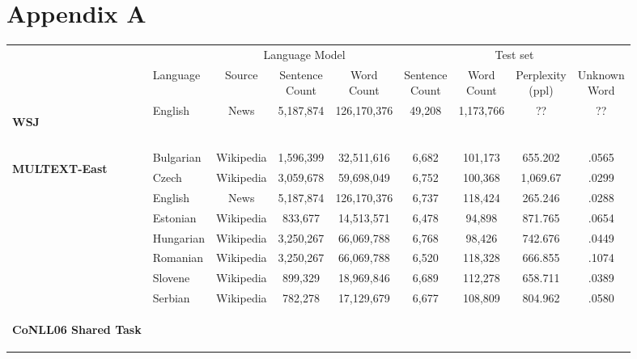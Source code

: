 \appendix
\section{Appendix A}
\label{app:lm}

\begin{table}[h]
  \begin{tabular}{l|l|c|c|c|c|c|c|c|}
    \cline{2-9}
    & & \multicolumn{3}{c|}{Language Model} & \multicolumn{4}{c|}{Test set}\\    \cline{2-9}
    & Language & Source & \specialcell{Sentence\\Count} & \specialcell{Word\\Count} & \specialcell{Sentence\\Count} & \specialcell{Word\\Count} & \specialcell{Perplexity\\(ppl)} & \specialcell{Unknown\\Word} \\ \cline{1-9}
    \multirow{1}{*}{\begin{sideways}\textbf{WSJ}\end{sideways}} 
    &English & News & 5,187,874 & 126,170,376 & 49,208 & 1,173,766 & ?? & ??\\
    & & & & && & &\\\hline
    \multirow{8}{*}{\begin{sideways}\textbf{MULTEXT-East}\end{sideways}}
    &Bulgarian& Wikipedia &1,596,399 & 32,511,616  & 6,682 & 101,173 & 655.202 & .0565\\
    &Czech & Wikipedia &3,059,678 & 59,698,049 & 6,752 & 100,368 & 1,069.67 & .0299\\
    &English & News & 5,187,874 & 126,170,376 & 6,737 & 118,424 & 265.246 & .0288\\
    &Estonian & Wikipedia &833,677 & 14,513,571 & 6,478 & 94,898 & 871.765 & .0654\\
    &Hungarian & Wikipedia &3,250,267& 66,069,788 & 6,768 & 98,426 & 742.676 & .0449\\
    &Romanian & Wikipedia &3,250,267&66,069,788  & 6,520 & 118,328 & 666.855 & .1074\\
    &Slovene & Wikipedia & 899,329&18,969,846 & 6,689 & 112,278 & 658.711 & .0389\\
    &Serbian & Wikipedia & 782,278 & 17,129,679 & 6,677 & 108,809 & 804.962 & .0580\\
    \hline %
    \multirow{10}{*}{\begin{sideways}\textbf{CoNLL06 Shared Task}\end{sideways}}

\end{tabular}
\end{table}
